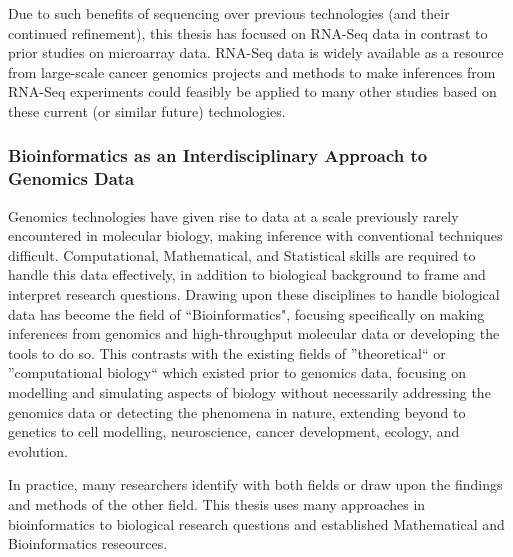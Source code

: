 Due to such benefits of sequencing over previous technologies (and their continued refinement), this thesis has focused on RNA-Seq data in contrast to prior studies on microarray data. RNA-Seq data is widely available as a resource from large-scale cancer genomics projects and methods to make inferences from RNA-Seq experiments could feasibly be applied to many other studies based on these current (or similar future) technologies.


\subsubsection{Bioinformatics as an Interdisciplinary Approach to Genomics Data}
Genomics technologies have given rise to data at a scale previously rarely encountered in molecular biology, making inference with conventional techniques difficult. Computational, Mathematical, and Statistical skills are required to handle this data effectively, in addition to biological background to frame and interpret research questions. Drawing upon these disciplines to handle biological data has become the field of ``Bioinformatics", focusing specifically on making inferences from genomics and high-throughput molecular data or developing the tools to do so. This contrasts with the existing fields of ''theoretical`` or ''computational biology`` which existed prior to genomics data, focusing on modelling and simulating aspects of biology without necessarily addressing the genomics data or detecting the phenomena in nature, extending beyond to genetics to cell modelling, neuroscience, cancer development, ecology, and evolution.

In practice, many researchers identify with both fields or draw upon the findings and methods of the other field. This thesis uses many approaches in bioinformatics to biological research questions and established Mathematical and Bioinformatics reseources.



